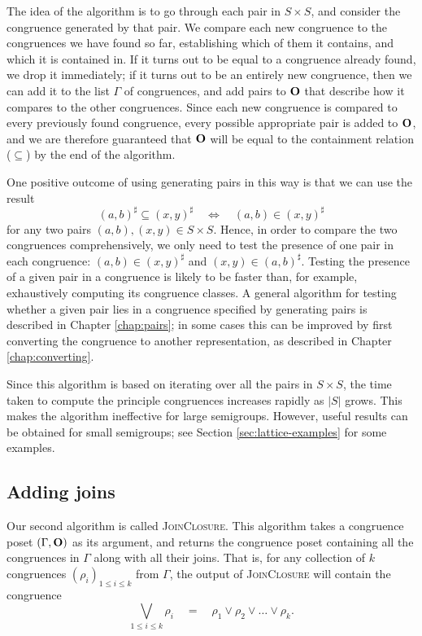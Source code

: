 The idea of the algorithm is to go through each pair in $S \times S$, and
consider the congruence generated by that pair.  We compare each new congruence
to the congruences we have found so far, establishing which of them it contains,
and which it is contained in.  If it turns out to be equal to a congruence
already found, we drop it immediately; if it turns out to be an entirely new
congruence, then we can add it to the list $\Gamma$ of congruences, and add
pairs to $\mathbf{O}$ that describe how it compares to the other congruences.  Since
each new congruence is compared to every previously found congruence, every
possible appropriate pair is added to $\mathbf{O}$, and we are therefore guaranteed
that $\mathbf{O}$ will be equal to the containment relation ($\subseteq$) by the end of
the algorithm.

One positive outcome of using generating pairs in this way is that we can use
the result
$$(a,b)^\sharp \subseteq (x,y)^\sharp \quad\iff\quad (a,b) \in (x,y)^\sharp$$
for any two pairs $(a,b), (x,y) \in S \times S$.  Hence, in order to compare the
two congruences comprehensively, we only need to test the presence of one pair
in each congruence: $(a,b) \in (x,y)^\sharp$ and $(x,y) \in (a,b)^\sharp$.
Testing the presence of a given pair in a congruence is likely to be faster
than, for example, exhaustively computing its congruence classes.  A general
algorithm for testing whether a given pair lies in a congruence specified by
generating pairs is described in Chapter \ref{chap:pairs}; in some cases this
can be improved by first converting the congruence to another representation, as
described in Chapter \ref{chap:converting}.

Since this algorithm is based on iterating over all the pairs in $S \times S$,
the time taken to compute the principle congruences increases rapidly as $|S|$
grows.  This makes the algorithm ineffective for large semigroups.  However,
useful results can be obtained for small semigroups; see Section
\ref{sec:lattice-examples} for some examples.

\subsection{Adding joins}
\label{sec:join-closure}

Our second algorithm is called \textsc{JoinClosure}.  This algorithm takes a
congruence poset $(\Gamma, \mathbf{O})$ as its argument, and returns the congruence
poset containing all the congruences in $\Gamma$ along with all their joins.
That is, for any collection of $k$ congruences
$(\rho_i)_{1 \leq i \leq k}$ from $\Gamma$, the output of
\textsc{JoinClosure} will contain the congruence
$$\bigvee_{1 \leq i \leq k} \rho_i
\quad=\quad \rho_1 \vee \rho_2 \vee \ldots \vee \rho_k.$$

